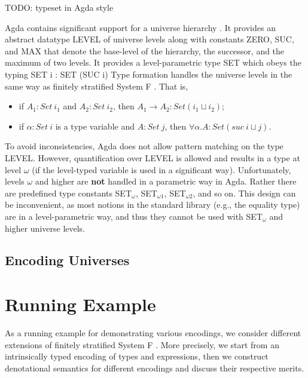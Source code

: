 \documentclass[manuscript,screen,review,anonymous]{acmart}
\begin{document}
TODO: typeset in Agda style

Agda contains significant support for a universe hierarchy \cite{readthedoc?}. It
provides an abstract datatype LEVEL of universe levels along with
constants ZERO, SUC, and MAX that denote the base-level of the
hierarchy, the successor, and the maximum of two levels.
It provides a level-parametric type SET which obeys the typing
SET i : SET (SUC i)
Type formation handles the universe levels in the same way as finitely
stratified System F \cite{DBLP:journals/iandc/Leivant91}. That is,
\begin{itemize}
\item if $A_1 : Set~ i_1$ and $A_2 : Set~i_2$, then $A_1 \to A_2 : Set
  (i_1 \sqcup i_2)$;
\item  if  $\alpha : Set~i$ is a type variable and $A : Set~j$, then
  $\forall \alpha. A : Set (suc~i \sqcup j)$.
\end{itemize}

To avoid inconsistencies, Agda does not allow pattern matching on the
type LEVEL. However, quantification over LEVEL is allowed and results
in a type at level $\omega$ (if the level-typed variable is used in a
significant way). Unfortunately, levels $\omega$ and higher are
\textbf{not} handled in a parametric way in Agda. Rather there are
predefined type constants SET$_\omega$, SET$_{\omega1}$,
SET$_{\omega2}$, and so on. This design can be inconvenient, as most
notions in the standard library (e.g., the equality type) are in a
level-parametric way, and thus they cannot be used with SET$_\omega$
and higher universe levels. 

\subsection{Encoding Universes}
\label{sec:encoding-universes}



\section{Running Example}
\label{sec:running-example}

As a running example for demonstrating various encodings, we consider
different extensions of finitely stratified System F
\cite{DBLP:journals/iandc/Leivant91}. More precisely, we start from an
intrinsically typed encoding of types and expressions, then we
construct denotational semantics for different encodings and discuss
their respective merits.
\end{document}
